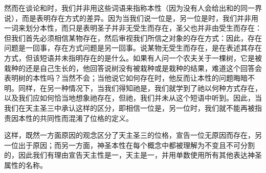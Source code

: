 然而在谈论和时，我们并非用这些词语来指称本性（因为没有人会给出和的同一界说），而是表明存在方式的差异。因为当我们说一位是，另一位是时，我们并非用一词来划分本性，而只是表明圣子并非无受生而存在，圣父也并非由受生而存在：但我们首先必须相信某物存在，然后审视我们所信之对象的存在方式：因此，存在问题是一回事，存在方式问题是另一回事。说某物无受生而存在，是在表述其存在方式，但该短语并未指明存在的是什么。如果有人问一个农夫关于一棵树，它是被栽种的还是自己生长的，他回答说树没有被栽种或是栽种的结果，难道这个回答会表明树的本性吗？当然不会；当他说它如何存在时，他反而让本性的问题晦暗不明。同样，在另一种情况下，当我们得知祂是，我们就学到了祂以何种方式存在，以及我们应如何恰当地想象祂存在，但祂，我们并未从这个短语中听到。因此，当我们在天主圣三中承认这样的区分，即相信一位是，另一位时，我们就不能再被指责因本性的共同性而混淆了位格的定义。\par

这样，既然一方面原因的观念区分了天主圣三的位格，宣告一位无原因而存在，另一位出于原因；而另一方面，神圣本性在每个概念中都被理解为不变且不可分割的，因此我们有理由宣告天主性是一，天主是一，并用单数使用所有其他表达神圣属性的名称。\par

